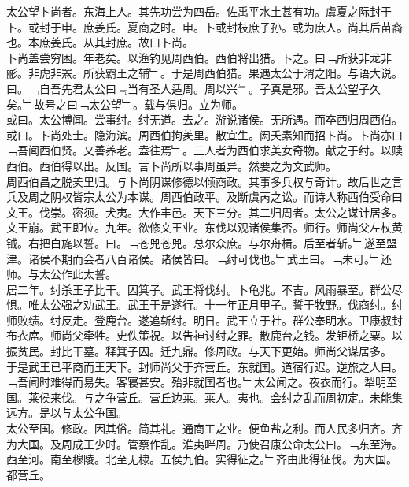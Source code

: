 \documentclass{zhvt-classic}
\begin{document}

\hspace*{2em}太公望卜尚者。东海上人。其先功尝为四岳。佐禹平水土甚有功。虞夏之际封于卜。或封于申。庶姜氏。夏商之时。申。卜或封枝庶子孙。或为庶人。尚其后苗裔也。本庶姜氏。从其封庶。故曰卜尚。\\
\hspace*{2em}卜尚盖尝穷困。年老矣。以渔钓见周西伯。西伯将出猎。卜之。曰﹁所获非龙非彨。非虎非罴。所获霸王之辅﹂。于是周西伯猎。果遇太公于渭之阳。与语大说。曰。﹁自吾先君太公曰﹃当有圣人适周。周以兴﹄。子真是邪。吾太公望子久矣。﹂故号之曰﹁太公望﹂。载与俱归。立为师。\\
\hspace*{2em}或曰。太公博闻。尝事纣。纣无道。去之。游说诸侯。无所遇。而卒西归周西伯。或曰。卜尚处士。隐海滨。周西伯拘羑里。散宜生。闳夭素知而招卜尚。卜尚亦曰﹁吾闻西伯贤。又善养老。盍往焉﹂。三人者为西伯求美女奇物。献之于纣。以赎西伯。西伯得以出。反国。言卜尚所以事周虽异。然要之为文武师。\\
\hspace*{2em}周西伯昌之脱羑里归。与卜尚阴谋修德以倾商政。其事多兵权与奇计。故后世之言兵及周之阴权皆宗太公为本谋。周西伯政平。及断虞芮之讼。而诗人称西伯受命曰文王。伐崇。密须。犬夷。大作丰邑。天下三分。其二归周者。太公之谋计居多。\\
\hspace*{2em}文王崩。武王即位。九年。欲修文王业。东伐以观诸侯集否。师行。师尚父左杖黄钺。右把白旄以誓。曰。﹁苍兕苍兕。总尔众庶。与尔舟楫。后至者斩。﹂遂至盟津。诸侯不期而会者八百诸侯。诸侯皆曰。﹁纣可伐也。﹂武王曰。﹁未可。﹂还师。与太公作此太誓。\\
\hspace*{2em}居二年。纣杀王子比干。囚箕子。武王将伐纣。卜龟兆。不吉。风雨暴至。群公尽惧。唯太公强之劝武王。武王于是遂行。十一年正月甲子。誓于牧野。伐商纣。纣师败绩。纣反走。登鹿台。遂追斩纣。明日。武王立于社。群公奉明水。卫康叔封布衣席。师尚父牵牲。史佚策祝。以告神讨纣之罪。散鹿台之钱。发钜桥之粟。以振贫民。封比干墓。释箕子囚。迁九鼎。修周政。与天下更始。师尚父谋居多。\\
\hspace*{2em}于是武王已平商而王天下。封师尚父于齐营丘。东就国。道宿行迟。逆旅之人曰。﹁吾闻时难得而易失。客寝甚安。殆非就国者也。﹂太公闻之。夜衣而行。犁明至国。莱侯来伐。与之争营丘。营丘边莱。莱人。夷也。会纣之乱而周初定。未能集远方。是以与太公争国。\\
\hspace*{2em}太公至国。修政。因其俗。简其礼。通商工之业。便鱼盐之利。而人民多归齐。齐为大国。及周成王少时。管蔡作乱。淮夷畔周。乃使召康公命太公曰。﹁东至海。西至河。南至穆陵。北至无棣。五侯九伯。实得征之。﹂齐由此得征伐。为大国。都营丘。\\
\end{document}
